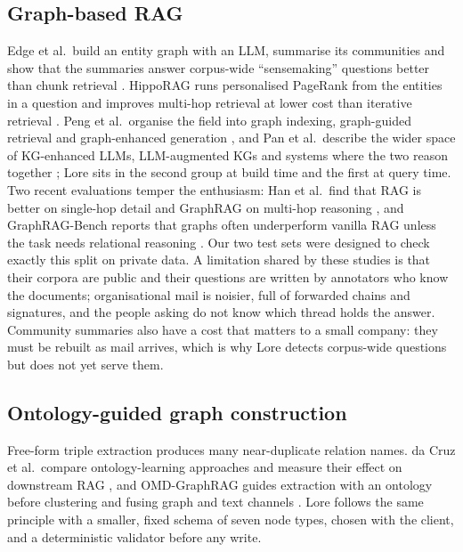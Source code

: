 \documentclass[12pt,onecolumn,draftclsnofoot]{IEEEtran}
\begin{document}
\subsection{Graph-based RAG}
Edge et al.\ build an entity graph with an LLM, summarise its communities and show that the summaries answer corpus-wide ``sensemaking'' questions better than chunk retrieval \cite{edge2024graphrag}. HippoRAG runs personalised PageRank from the entities in a question and improves multi-hop retrieval at lower cost than iterative retrieval \cite{gutierrez2024hipporag}. Peng et al.\ organise the field into graph indexing, graph-guided retrieval and graph-enhanced generation \cite{peng2024graphragsurvey}, and Pan et al.\ describe the wider space of KG-enhanced LLMs, LLM-augmented KGs and systems where the two reason together \cite{pan2024unifying}; Lore sits in the second group at build time and the first at query time. Two recent evaluations temper the enthusiasm: Han et al.\ find that RAG is better on single-hop detail and GraphRAG on multi-hop reasoning \cite{han2025ragvsgraphrag}, and GraphRAG-Bench reports that graphs often underperform vanilla RAG unless the task needs relational reasoning \cite{xiang2025graphragbench}. Our two test sets were designed to check exactly this split on private data. A limitation shared by these studies is that their corpora are public and their questions are written by annotators who know the documents; organisational mail is noisier, full of forwarded chains and signatures, and the people asking do not know which thread holds the answer. Community summaries also have a cost that matters to a small company: they must be rebuilt as mail arrives, which is why Lore detects corpus-wide questions but does not yet serve them.

\subsection{Ontology-guided graph construction}
Free-form triple extraction produces many near-duplicate relation names. da Cruz et al.\ compare ontology-learning approaches and measure their effect on downstream RAG \cite{dacruz2025ontology}, and OMD-GraphRAG guides extraction with an ontology before clustering and fusing graph and text channels \cite{wang2026omdgraphrag}. Lore follows the same principle with a smaller, fixed schema of seven node types, chosen with the client, and a deterministic validator before any write.
\end{document}
